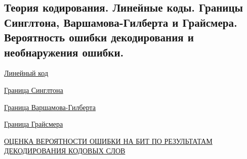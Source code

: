 \subsection{Теория кодирования. Линейные коды. Границы Синглтона, Варшамова-Гилберта и Грайсмера. Вероятность ошибки декодирования и необнаружения ошибки.}

\href{https://ru.wikipedia.org/wiki/%D0%9B%D0%B8%D0%BD%D0%B5%D0%B9%D0%BD%D1%8B%D0%B9_%D0%BA%D0%BE%D0%B4}{Линейный код}

\href{https://ru.wikipedia.org/wiki/%D0%93%D1%80%D0%B0%D0%BD%D0%B8%D1%86%D0%B0_%D0%A1%D0%B8%D0%BD%D0%B3%D0%BB%D1%82%D0%BE%D0%BD%D0%B0}{Граница Синглтона}

\href{https://ru.wikipedia.org/wiki/%D0%93%D1%80%D0%B0%D0%BD%D0%B8%D1%86%D0%B0_%D0%92%D0%B0%D1%80%D1%88%D0%B0%D0%BC%D0%BE%D0%B2%D0%B0_%E2%80%94_%D0%93%D0%B8%D0%BB%D0%B1%D0%B5%D1%80%D1%82%D0%B0}{Граница Варшамова-Гилберта}

\href{https://wikicsu.ru/wiki/Griesmer_bound}{Граница Грайсмера}

\href{http://jre.cplire.ru/jre/apr14/4/text.html}{ОЦЕНКА ВЕРОЯТНОСТИ ОШИБКИ НА БИТ ПО РЕЗУЛЬТАТАМ ДЕКОДИРОВАНИЯ КОДОВЫХ СЛОВ}